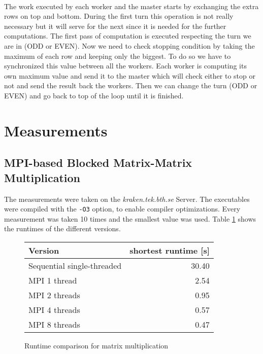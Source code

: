 \documentclass[]{article}
\begin{document}
\paragraph{} The work executed by each worker and the master starts by exchanging the extra rows on top and bottom. During the first turn this operation is not really necessary but it will serve for the next since it is needed for the further computations. The first pass of computation is executed respecting the turn we are in (ODD or EVEN). Now we need to check stopping condition by taking the maximum of each row and keeping only the biggest. To do so we have to synchronized this value between all the workers. Each worker is computing its own maximum value and send it to the master which will check either to stop or not and send the result back the workers. Then we can change the turn (ODD or EVEN) and go back to top of the loop until it is finished. 


\section{Measurements}

\subsection{MPI-based Blocked Matrix-Matrix Multiplication}

The measurements were taken on the \emph{kraken.tek.bth.se} Server. The executables were compiled with the \texttt{-O3} option, to enable compiler optimizations. Every measurement was taken 10 times and the smallest value was used. Table \ref{tab:matrix-mult-runtime} shows the runtimes of the different versions.

\begin{figure}[h]
	\centering
	\begin{tabular}{|l|r|}
		\hline
		\textbf{Version} & \textbf{shortest runtime [s]} \\
		\hline
		Sequential single-threaded & 30.40 \\ 
		\hline 
		MPI 1 thread & 2.54 \\ 
		\hline 
		MPI 2 threads & 0.95 \\ 
		\hline 
		MPI 4 threads & 0.57 \\ 
		\hline 
		MPI 8 threads & 0.47 \\ 
		\hline 
	\end{tabular} 
	\caption{Runtime comparison for matrix multiplication}
	\label{tab:matrix-mult-runtime}
\end{figure}
\end{document}
